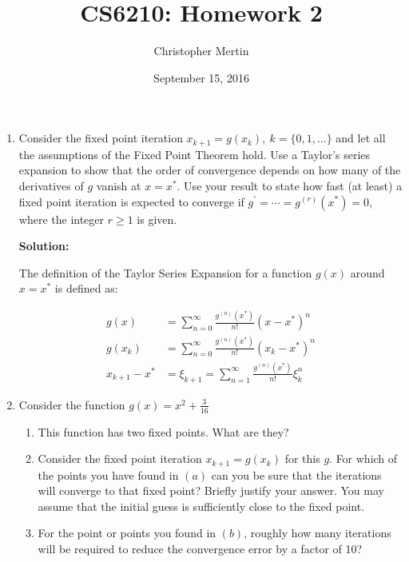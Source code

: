 \documentclass[12pt]{article}
\begin{document}
\title{CS6210: Homework 2}
\author{Christopher Mertin}
\date{September 15, 2016}
\maketitle

\begin{enumerate}
\item Consider the fixed point iteration $x_{k+1} = g\left( x_{k}\right),\ k=\{0,1,\ldots\}$
and let all the assumptions of the Fixed Point Theorem hold. Use a Taylor's series expansion
to show that the order of convergence depends on how many of the derivatives of $g$ vanish
at $x = x^{*}$. Use your result to state how fast (at least) a fixed point iteration
is expected to converge if $g^{\prime} = \cdots = g^{(r)}\left( x^{*}\right) = 0$,
where the integer $r \geq 1$ is given.

{\bf Solution:}

The definition of the Taylor Series Expansion for a function $g(x)$ around $x = x^{*}$ is defined as:

\begin{align*}
g(x) &= \sum_{n=0}^{\infty} \frac{g^{(n)}\left( x^{*}\right)}{n!} \left( x - x^{*}\right)^{n}\\
g\left( x_{k}\right) &= \sum_{n=0}^{\infty} \frac{g^{(n)}\left( x^{*}\right)}{n!} \left( x_{k} - x^{*}\right)^{n}\\
x_{k+1} - x^{*} &= \xi_{k+1} = \sum_{n=1}^{\infty} \frac{g^{(n)}\left( x^{*}\right)}{n!}\xi_{k}^{n}
\end{align*}

\item Consider the function $g(x) = x^{2} + \frac{3}{16}$
\begin{enumerate}
  \item This function has two fixed points. What are they?
  \item Consider the fixed point iteration $x_{k+1} = g\left( x_{k}\right)$ for this $g$.
  For which of the points you have found in $(a)$ can you be sure that the iterations
  will converge to that fixed point? Briefly justify your answer. You may assume that
  the initial guess is sufficiently close to the fixed point.
  \item For the point or points you found in $(b)$, roughly how many iterations will be
  required to reduce the convergence error by a factor of 10?
\end{enumerate}


\end{enumerate}
\end{document}
